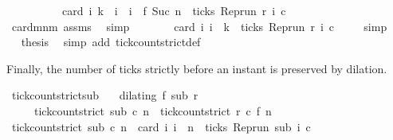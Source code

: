\begin{isabellebody}
\ \ \ \ \ \ \ \ \ {\isacharplus}\ card\ {\isacharbraceleft}i{\isachardot}\ k\ {\isasymle}\ i\ {\isasymand}\ i\ {\isacharless}\ f\ {\isacharparenleft}Suc\ n{\isacharparenright}\ {\isasymand}\ ticks\ {\isacharparenleft}{\isacharparenleft}Rep{\isacharunderscore}run\ r{\isacharparenright}\ i\ c{\isacharparenright}{\isacharbraceright}{\isacartoucheclose}\ \isanewline
\ \ \ \ \isamarkupfalse%
\ card{\isacharunderscore}mnm{\isacharprime}\ assms{\isacharparenleft}{}{\isacharparenright}\ \isamarkupfalse%
\ simp\isanewline
\ \ \isamarkupfalse%
\ \isamarkupfalse%
\ {\isacartoucheopen}{\isachardot}{\isachardot}{\isachardot}\ {\isacharequal}\ card\ {\isacharbraceleft}i{\isachardot}\ i\ {\isacharless}\ k\ {\isasymand}\ ticks\ {\isacharparenleft}{\isacharparenleft}Rep{\isacharunderscore}run\ r{\isacharparenright}\ i\ c{\isacharparenright}{\isacharbraceright}{\isacartoucheclose}\ \isamarkupfalse%
\ {\isacharasterisk}\ \isamarkupfalse%
\ simp\isanewline
\ \ \isamarkupfalse%
\ \isamarkupfalse%
\ {\isacharquery}thesis\ \isamarkupfalse%
\ {\isacharparenleft}simp\ add{\isacharcolon}\ tick{\isacharunderscore}count{\isacharunderscore}strict{\isacharunderscore}def{\isacharparenright}\isanewline
{}\isamarkupfalse%
%
\endisatagproof
{\isafoldproof}%
%
\isadelimproof
%
\endisadelimproof
%
\begin{isamarkuptext}%
Finally, the number of ticks strictly before an instant is preserved by dilation.%
\end{isamarkuptext}\isamarkuptrue%
\isamarkupfalse%
\ tick{\isacharunderscore}count{\isacharunderscore}strict{\isacharunderscore}sub{\isacharcolon}\isanewline
\ \ \ {\isacartoucheopen}dilating\ f\ sub\ r{\isacartoucheclose}\isanewline
\ \ \ \ \ {\isacartoucheopen}tick{\isacharunderscore}count{\isacharunderscore}strict\ sub\ c\ n\ {\isacharequal}\ tick{\isacharunderscore}count{\isacharunderscore}strict\ r\ c\ {\isacharparenleft}f\ n{\isacharparenright}{\isacartoucheclose}\isanewline
%
\isadelimproof
%
\endisadelimproof
%
\isatagproof
{}\isamarkupfalse%
\ {\isacharminus}\isanewline
\ \ \isamarkupfalse%
\ {\isacartoucheopen}tick{\isacharunderscore}count{\isacharunderscore}strict\ sub\ c\ n\ {\isacharequal}\ card\ {\isacharbraceleft}i{\isachardot}\ i\ {\isacharless}\ n\ {\isasymand}\ ticks\ {\isacharparenleft}{\isacharparenleft}Rep{\isacharunderscore}run\ sub{\isacharparenright}\ i\ c{\isacharparenright}{\isacharbraceright}{\isacartoucheclose}\isanewline

\end{isabellebody}
